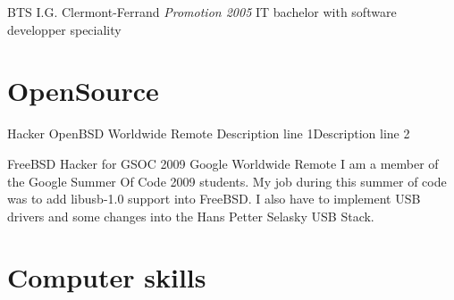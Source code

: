 \documentclass[11pt,a4paper,sans]{moderncv}
\begin{document}
{BTS}
{I.G.}
{Clermont-Ferrand}
{\textit{Promotion 2005}}
{IT bachelor with software developper speciality}

\section{OpenSource}

{Hacker}
{OpenBSD}
{Worldwide Remote}
{}
{Description line 1\newline{}Description line 2}

{FreeBSD Hacker for GSOC 2009}
{Google}
{Worldwide Remote}
{}
{I am a member of the Google Summer Of Code 2009 students. My job during this
summer of code was to add libusb-1.0 support into FreeBSD. I also have to
implement USB drivers and some changes into the Hans Petter Selasky USB Stack.
}

\section{Computer skills}
\end{document}
